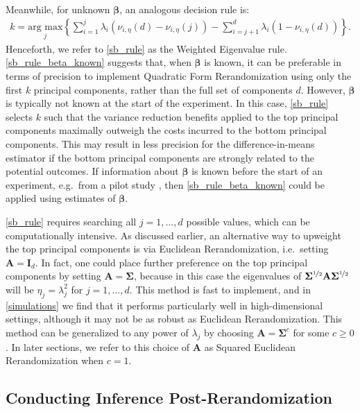 \documentclass[11pt,twoside]{article}
\theoremstyle{definition}
\theoremstyle{remark}
\begin{document}
Meanwhile, for unknown $\bm{\beta}$, an analogous decision rule is:
\begin{align} \label{sb_rule}
   k = \underset{j}{\text{arg max}} \left\{  \sum^j_{i=1} \lambda_i (\nu_{i, \eta}(d) - \nu_{i, \eta}(j)) - \sum^d_{i=j+1} \lambda_i (1 - \nu_{i, \eta}(d))\right\}.
\end{align} 
Henceforth, we refer to \cref{sb_rule} as the Weighted Eigenvalue rule. \cref{sb_rule_beta_known} suggests that, when $\bm{\beta}$ is known, it can be preferable in terms of precision to implement Quadratic Form Rerandomization using only the first $k$ principal components, rather than the full set of components $d$. However, $\bm{\beta}$ is typically not known at the start of the experiment. In this case, \cref{sb_rule} selects $k$ such that the variance reduction benefits applied to the top principal components maximally outweigh the costs incurred to the bottom principal components. This may result in less precision for the difference-in-means estimator if the bottom principal components are strongly related to the potential outcomes. If information about $\bm{\beta}$ is known before the start of an experiment, e.g.\ from a pilot study \citep{liu2023bayesian}, then \cref{sb_rule_beta_known} could be applied using estimates of $\bm{\beta}$. 

\cref{sb_rule} requires searching all $j = 1, \ldots, d$ possible values, which can be computationally intensive. As discussed earlier, an alternative way to upweight the top principal components is via Euclidean Rerandomization, i.e.\ setting $\mathbf{A} = \mathbf{I}_d$. In fact, one could place further preference on the top principal components by setting $\mathbf{A} = \mathbf{\Sigma}$, because in this case the eigenvalues of $\mathbf{\Sigma}^{\nicefrac{1}{2}} \mathbf{A} \mathbf{\Sigma}^{\nicefrac{1}{2}}$ will be $\eta_j = \lambda_j^2$ for $j = 1, \ldots, d$. This method is fast to implement, and in \cref{simulations} we find that it performs particularly well in high-dimensional settings, although it may not be as robust as Euclidean Rerandomization. This method can be generalized to any power of $\lambda_j$ by choosing $\mathbf{A} = \mathbf{\Sigma}^{c}$ for some $c \geq 0$. In later sections, we refer to this choice of $\mathbf{A}$ as Squared Euclidean Rerandomization when $c=1$. 


\subsection{Conducting Inference Post-Rerandomization}
\end{document}
